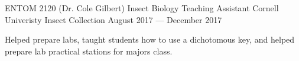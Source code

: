 \begin{cventries}
  \cventry
    {ENTOM 2120 (Dr. Cole Gilbert)} %
    {Insect Biology Teaching Assistant} %
    {Cornell Univeristy Insect Collection} %
    {August 2017 — December 2017} %
    {
      \begin{cvitems} %
        \item {Helped prepare labs, taught students how to use a dichotomous key, and helped prepare lab practical stations for majors class.}
      \end{cvitems}
    }
    
\end{cventries}
